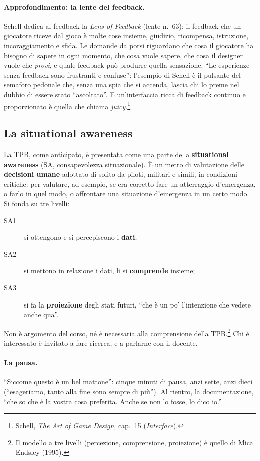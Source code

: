 \paragraph{Approfondimento: la lente del feedback.} Schell dedica al feedback
la \emph{Lens of Feedback} (lente n.~63): il feedback che un giocatore riceve
dal gioco è molte cose insieme, giudizio, ricompensa, istruzione,
incoraggiamento e sfida. Le domande da porsi riguardano che cosa il giocatore
ha bisogno di sapere in ogni momento, che cosa vuole sapere, che cosa il
designer vuole che \emph{provi}, e quale feedback può produrre quella
sensazione. ``Le esperienze senza feedback sono frustranti e confuse'':
l'esempio di Schell è il pulsante del semaforo pedonale che, senza una spia
che si accenda, lascia chi lo preme nel dubbio di essere stato ``ascoltato''.
E un'interfaccia ricca di feedback continuo e proporzionato è quella che
chiama \emph{juicy}.\footnote{Schell, \emph{The Art of Game Design}, cap.~15
(\emph{Interface}).}

\subsection{La situational awareness}

La TPB, come anticipato, è presentata come una parte della
\textbf{situational awareness} (SA, consapevolezza situazionale). È un metro
di valutazione delle \textbf{decisioni umane} adottato di solito da piloti,
militari e simili, in condizioni critiche: per valutare, ad esempio, se era
corretto fare un atterraggio d'emergenza, o farlo in quel modo, o affrontare
una situazione d'emergenza in un certo modo. Si fonda su tre livelli:
\begin{description}
  \item[SA1] si ottengono e si percepiscono i \textbf{dati};
  \item[SA2] si mettono in relazione i dati, li si \textbf{comprende}
        insieme;
  \item[SA3] si fa la \textbf{proiezione} degli stati futuri, ``che è un po'
        l'intenzione che vedete anche qua''.
\end{description}
Non è argomento del corso, né è necessaria alla comprensione della
TPB.\footnote{Il modello a tre livelli (percezione, comprensione,
proiezione) è quello di Mica Endsley (1995).} Chi è interessato è invitato a
fare ricerca, e a parlarne con il docente.

\paragraph{La pausa.} ``Siccome questo è un bel mattone'': cinque minuti di
pausa, anzi sette, anzi dieci (``esageriamo, tanto alla fine sono sempre di
più''). Al rientro, la documentazione, ``che so che è la vostra cosa
preferita. Anche se non lo fosse, lo dico io.''

